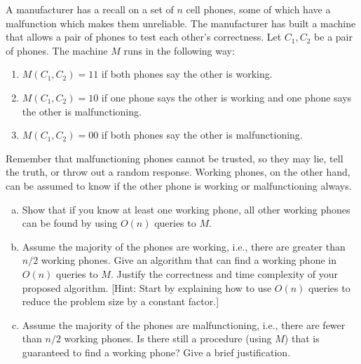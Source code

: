 \documentclass[11pt]{article}
\begin{document}
    \newpage
    
    \begin{tcolorbox}[title={Problem 3 (Malfunctioning Phones, 40 pts)}]
        A manufacturer has a recall on a set of $n$ cell phones, some of which have a malfunction which makes them unreliable. The manufacturer has built a machine that allows a pair of phones to test each other's correctness. Let $C_1, C_2$ be a pair of phones. The machine $M$ runs in the following way:
        \begin{enumerate}
            \item $M(C_1, C_2) = 11$ if both phones say the other is working.
            \item $M(C_1, C_2) = 10$ if one phone says the other is working and one phone says the other is malfunctioning. 
            \item $M(C_1, C_2) = 00$ if both phones say the other is malfunctioning. 
        \end{enumerate}
        Remember that malfunctioning phones cannot be trusted, so they may lie, tell the truth, or throw out a random response. Working phones, on the other hand, can be assumed to know if the other phone is working or malfunctioning always. 
        \begin{enumerate}[(a)]
            \item Show that if you know at least one working phone, all other working phones can be found by using $O(n)$ queries to $M$.
            \item Assume the majority of the phones are working, i.e., there are greater than $n/2$ working phones. Give an algorithm that can find a working phone in $O(n)$ queries to $M$. Justify the correctness and time complexity of your proposed algorithm. [Hint: Start by explaining how to use $O(n)$ queries to reduce the problem size by a constant factor.]
            \item Assume the majority of the phones are malfunctioning, i.e., there are fewer than $n/2$ working phones. Is there still a procedure (using $M$) that is guaranteed to find a working phone? Give a brief justification.
        \end{enumerate}
    \end{tcolorbox}
    
\end{document}
